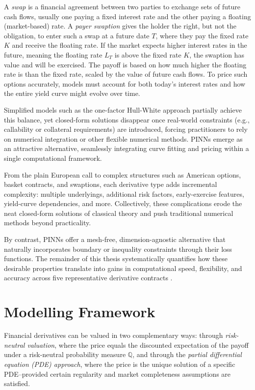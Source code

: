 \documentclass[12pt]{report} %
\theoremstyle{plain} %
\theoremstyle{definition} %
\theoremstyle{remark} %
\begin{document}
A \emph{swap} is a financial agreement between two parties to exchange sets of future 
cash flows, usually one paying a fixed interest rate and the other paying a floating 
(market-based) rate. A \emph{payer swaption} gives the holder the right, but not the obligation, 
to enter such a swap at a future date \(T\), where they pay the fixed rate \(K\) and receive 
the floating rate. If the market expects higher interest rates in the future, meaning the floating 
rate \(L_T\) is above the fixed rate \(K\), the swaption has value and will be exercised. The 
payoff is based on how much higher the floating rate is than the fixed rate, scaled by the value 
of future cash flows. To price such options accurately, models must account for both today's 
interest rates and how the entire yield curve might evolve over time.

Simplified models such as the one-factor Hull-White approach partially achieve this balance, yet
closed-form solutions disappear once real-world constraints (e.g., callability or collateral
requirements) are introduced, forcing practitioners to rely on numerical integration or other
flexible numerical methods. PINNs emerge as an attractive alternative, seamlessly integrating curve
fitting and pricing within a single computational framework.

From the plain European call to complex structures such as American options, basket contracts, and
swaptions, each derivative type adds incremental complexity: multiple underlyings, additional risk
factors, early-exercise features, yield-curve dependencies, and more. Collectively, these
complications erode the neat closed-form solutions of classical theory and push traditional
numerical methods beyond practicality.

By contrast, PINNs offer a mesh-free, dimension-agnostic alternative that naturally incorporates
boundary or inequality constraints through their loss functions. The remainder of this thesis
systematically quantifies how these desirable properties translate into gains in computational
speed, flexibility, and accuracy across five representative derivative contracts
\cite{huge2020differentialmachinelearning,heaton2018deeplearningfinance}.

\section{Modelling Framework}\label{sec:modelling_framework}

Financial derivatives can be valued in two complementary ways: through \textit{risk-neutral valuation}, 
where the price equals the discounted expectation of the payoff under a risk-neutral 
probability measure $\mathbb Q$, and through the \textit{partial differential equation 
(PDE) approach}, where the price is the unique solution of a specific PDE--provided certain regularity and market completeness assumptions are satisfied.
\end{document}

